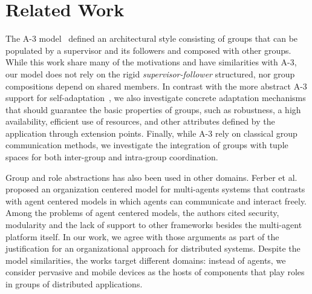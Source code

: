\section{Related Work}\label{sec:related_work}

The A-3 model~\cite{Baresi:2011:2} defined an architectural style consisting of groups that can be populated by a supervisor and its followers and composed with other groups. While this work share many of the motivations and have similarities with A-3, our model does not rely on the rigid \textit{supervisor-follower} structured, nor group compositions depend on shared members.
In contrast with the more abstract A-3 support for self-adaptation~\cite{Baresi:2011:2}, we also investigate  concrete adaptation mechanisms that should guarantee the basic properties of groups, such as robustness, a high availability, efficient use of resources, and other attributes defined by the application through extension points. Finally, while A-3 rely on classical group communication methods, we investigate the integration of groups with tuple spaces for both inter-group and intra-group coordination.

Group and role abstractions has also been used in other domains. Ferber et al.~\cite{Ferber:2004} proposed an organization centered model for multi-agents systems that contrasts with agent centered models in which agents can communicate and interact freely. Among the problems of agent centered models, the authors cited security, modularity and the lack of support to other frameworks besides the multi-agent platform itself. In our work, we agree with those arguments as part of the justification for an organizational approach for distributed systems. Despite the model similarities, the works target different domains: instead of agents, we consider pervasive and mobile devices as the hosts of components that play roles in groups of distributed applications. %

